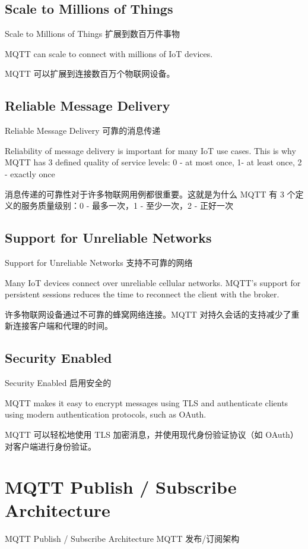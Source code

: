 \documentclass{ctexbook}
\begin{document}
\subsection{Scale to Millions of Things}
Scale to Millions of Things 扩展到数百万件事物

MQTT can scale to connect with millions of IoT devices.

MQTT 可以扩展到连接数百万个物联网设备。

\subsection{Reliable Message Delivery}
Reliable Message Delivery 可靠的消息传递

Reliability of message delivery is important for many IoT use cases. This is why MQTT has 3 defined quality of service levels: 0 - at most once, 1- at least once, 2 - exactly once

消息传递的可靠性对于许多物联网用例都很重要。这就是为什么 MQTT 有 3 个定义的服务质量级别：0 - 最多一次，1 - 至少一次，2 - 正好一次

\subsection{Support for Unreliable Networks}
Support for Unreliable Networks 支持不可靠的网络

Many IoT devices connect over unreliable cellular networks. MQTT's support for persistent sessions reduces the time to reconnect the client with the broker.

许多物联网设备通过不可靠的蜂窝网络连接。MQTT 对持久会话的支持减少了重新连接客户端和代理的时间。

\subsection{Security Enabled}
Security Enabled 启用安全的

MQTT makes it easy to encrypt messages using TLS and authenticate clients using modern authentication protocols, such as OAuth.

MQTT 可以轻松地使用 TLS 加密消息，并使用现代身份验证协议（如 OAuth）对客户端进行身份验证。

\section{MQTT Publish / Subscribe Architecture}
MQTT Publish / Subscribe Architecture MQTT 发布/订阅架构
\end{document}
